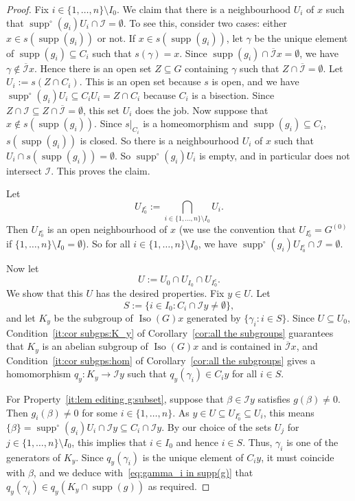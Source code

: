 \documentclass[a4paper, 12pt]{amsart}
\theoremstyle{plain}
\theoremstyle{definition}
\theoremstyle{remark}
\newcommand{\Iso}{\operatorname{Iso}}
\newcommand{\supp}{\operatorname{supp}}
\newcommand{\Ii}{\mathcal{I}}
\newcommand{\Iicl}{\overline{\mathcal{I}}}
\numberwithin{equation}{section}
\newcommand{\W}{Z} %
\begin{document}
\begin{proof}
Fix $i \in \{1, \dots, n\} \setminus I_0$. We claim that there is a
neighbourhood $U_i$ of $x$ such that $\supp^\circ(g_i) U_i \cap \Ii =
\emptyset$. To see this, consider
two cases: either $x \in s(\supp(g_i))$ or not. If $x \in s(\supp(g_i))$, let
$\gamma$ be the unique element of $\supp(g_i) \subseteq C_i$ such that
$s(\gamma) = x$. Since $\supp(g_i) \cap \Iicl x = \emptyset$, we have $\gamma
\not\in \Iicl x$. Hence there is an open set
$\W \subseteq G$ containing $\gamma$ such that
$\W \cap \Iicl = \emptyset$. Let $U_i := s(\W \cap C_i)$. This is an open set
because $s$ is open, and we have $\supp^\circ(g_i) U_i \subseteq C_i U_i = \W
\cap C_i $ because $C_i$ is a bisection. Since $\W \cap \Ii \subseteq
\W \cap \Iicl = \emptyset$, this set $U_i$ does the job. Now suppose that $x
\not\in s(\supp(g_i))$. Since $s|_{C_i}$ is a homeomorphism and $\supp(g_i)
\subseteq C_i$, $s(\supp(g_i))$ is closed. So there is a neighbourhood $U_i$ of
$x$ such that $U_i \cap s(\supp(g_i)) = \emptyset$. So $\supp^\circ(g_i) U_i$
is empty, and in particular does not intersect $\Ii$. This proves the claim.

Let
\[
    U_{I_0^c} := \bigcap_{i \in \{1 ,\dots, n\} \setminus I_0} U_i.
\]
Then $U_{I_0^c}$ is an open neighbourhood of $x$ (we use the convention that
$U_{I_0^c}=G^{(0)}$ if $\{1 ,\dots, n\} \setminus I_0=\emptyset$). So for all
$i \in \{1, \dots, n\} \setminus I_0$, we have $\supp^\circ(g_i) U_{I_0^c}
\cap \Ii = \emptyset$.

Now let
\[
U := U_0 \cap U_{I_0} \cap U_{I_0^c}.
\]
We show that this $U$ has the desired properties. Fix $y \in U$. Let
\[
S:= \{i \in I_0: C_i \cap \Ii y \not= \emptyset\},
\]
and let $K_y$ be the subgroup of $\Iso(G) x$ generated by
$\{\gamma_i : i\in S\}$. Since $U \subseteq U_0$,
Condition~\ref{it:cor subgps:K_y} of Corollary~\ref{cor:all the subgroups}
guarantees that $K_y$ is an abelian subgroup of $\Iso(G) x$ and is contained
in $\Iicl x$, and Condition~\ref{it:cor subgps:hom} of Corollary~\ref{cor:all
the subgroups} gives a homomorphism $q_y \colon K_y \to \Ii y$ such that
$q_y(\gamma_i) \in C_i y$ for all $i\in S$.

For Property~\ref{it:lem editing g:subset}, suppose that $\beta \in \Ii y$
satisfies $g(\beta) \not= 0$. Then $g_i(\beta) \not= 0$ for some $i \in \{1,
\dots, n\}$. As $y\in U\subseteq U_{I_0^c}\subseteq U_i$, this means
$\{\beta\}= \supp^\circ (g_i)U_i\cap \Ii y \subseteq C_i \cap \Ii y$. By our
choice of the sets $U_j$ for $j \in\{1,\ldots,n\}\setminus I_0$, this implies
that $i \in I_0$ and hence $i\in S$. Thus, $\gamma_i$ is one of the
generators of $K_y$. Since $q_y(\gamma_i)$ is the unique element of $C_i y$,
it must coincide with $\beta$, and we deduce with~\eqref{eq:gamma_i in
supp(g)} that $q_y(\gamma_i) \in q_y(K_y \cap \supp(g))$ as required.


\end{proof}
\end{document}
